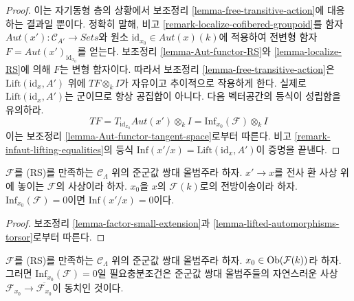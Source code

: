 \begin{proof}
이는 자기동형 층의 상황에서 보조정리
\ref{lemma-free-transitive-action}에 대응하는 결과일 뿐이다.
정확히 말해, 비고 \ref{remark-localize-cofibered-groupoid}를 함자
$\mathit{Aut}(x') : \mathcal{C}_{A'} \to \textit{Sets}$와 원소
$\text{id}_{x_0} \in \mathit{Aut}(x)(k)$에 적용하여 전변형 함자
$F = \mathit{Aut}(x')_{\text{id}_{x_0}}$를 얻는다. 보조정리
\ref{lemma-Aut-functor-RS}와 \ref{lemma-localize-RS}에 의해
$F$는 변형 함자이다. 따라서 보조정리
\ref{lemma-free-transitive-action}은
$\text{Lift}(\text{id}_x, A')$ 위에 $TF \otimes_k I$가 자유이고
추이적으로 작용하게 한다. 실제로 $\text{Lift}(\text{id}_x, A')$는
군이므로 항상 공집합이 아니다. 다음 벡터공간의 등식이 성립함을 유의하라.
$$
TF = T_{\text{id}_{x_0}} \mathit{Aut}(x') \otimes_k I =
\text{Inf}_{x_0}(\mathcal{F}) \otimes_k I
$$
이는 보조정리 \ref{lemma-Aut-functor-tangent-space}로부터 따른다.
비고 \ref{remark-infaut-lifting-equalities}의 등식
$\text{Inf}(x'/x) = \text{Lift}(\text{id}_x, A')$이 증명을 끝낸다.
\end{proof}

\begin{lemma}
\label{lemma-infaut-trivial}
$\mathcal{F}$를 (RS)를 만족하는 $\mathcal{C}_\Lambda$ 위의 준군값 쌍대
올범주라 하자. $x' \to x$를 전사 환 사상 위에 놓이는
$\mathcal{F}$의 사상이라 하자. $x_0$을 $x$의 $\mathcal{F}(k)$로의
전방이송이라 하자. $\text{Inf}_{x_0}(\mathcal{F}) = 0$이면
$\text{Inf}(x'/x) = 0$이다.
\end{lemma}

\begin{proof}
보조정리 \ref{lemma-factor-small-extension}과
\ref{lemma-lifted-automorphisms-torsor}로부터 따른다.
\end{proof}

\begin{lemma}
\label{lemma-infdef-trivial}
$\mathcal{F}$를 (RS)를 만족하는 $\mathcal{C}_\Lambda$ 위의 준군값 쌍대
올범주라 하자. $x_0 \in \mathop{\mathrm{Ob}}\nolimits(\mathcal{F}(k))$라 하자. 그러면
$\text{Inf}_{x_0}(\mathcal{F}) = 0$일 필요충분조건은 준군값 쌍대
올범주들의 자연스러운 사상
$\mathcal{F}_{x_0} \to \overline{\mathcal{F}_{x_0}}$이 동치인 것이다.
\end{lemma}

